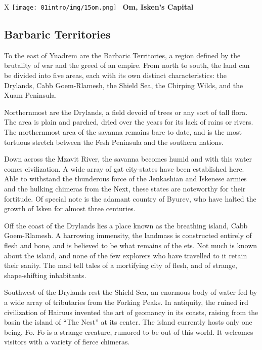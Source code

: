 \begin{table*}[b]%
    \begin{DndTable}[width=\linewidth]{X}
        \centering
        \texttt{[image: 01intro/img/15om.png]} \
        \centering \large{\textbf{Om, Isken's Capital}}
    \end{DndTable}
\end{table*}

\subsection*{Barbaric Territories}
To the east of Yuadrem are the Barbaric Territories, a region defined by the brutality of war and the greed of an empire.
From north to south, the land can be divided into five areas, each with its own distinct characteristics: the Drylands, Cabb Goem-Rlamesh, the Shield Sea, the Chirping Wilds, and the Xuam Peninsula.

Northernmost are the Drylands, a field devoid of trees or any sort of tall flora.
The area is plain and parched, dried over the years for its lack of rains or rivers.
The northernmost area of the savanna remains bare to date, and is the most tortuous stretch between the Fesh Peninsula and the southern nations.

Down across the Mzavit River, the savanna becomes humid and with this water comes civilization.
A wide array of gat city-states have been established here.
Able to withstand the thunderous force of the Jenkashian and Iskenese armies and the hulking chimeras from the Next, these states are noteworthy for their fortitude.
Of special note is the adamant country of Byurev, who have halted the growth of Isken for almost three centuries.

Off the coast of the Drylands lies a place known as the breathing island, Cabb Goem-Rlamesh.
A harrowing immensity, the landmass is constructed entirely of flesh and bone, and is believed to be what remains of the ets.
Not much is known about the island, and none of the few explorers who have travelled to it retain their sanity.
The mad tell tales of a mortifying city of flesh, and of strange, shape-shifting inhabitants.

Southwest of the Drylands rest the Shield Sea, an enormous body of water fed by a wide array of tributaries from the Forking Peaks.
In antiquity, the ruined ird civilization of Hairuus invented the art of geomancy in its coasts, raising from the basin the island of ``The Nest'' at its center.
The island currently hosts only one being, Fo.
Fo is a strange creature, rumored to be out of this world.
It welcomes visitors with a variety of fierce chimeras.

